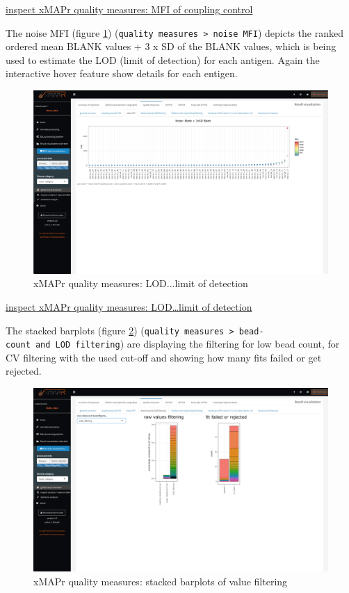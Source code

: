 \documentclass[
]{book}
\begin{document}
\href{figures/quality_measures__coupling_control_MFI.png}{inspect xMAPr quality measures: MFI of coupling control}

The noise MFI (figure \ref{fig:LOD}) (\texttt{quality\ measures\ \textgreater{}\ noise\ MFI}) depicts the ranked ordered mean BLANK values + 3 x SD of the BLANK values, which is being used to estimate the LOD (limit of detection) for each antigen. Again the interactive hover feature show details for each entigen.

\begin{figure}
\includegraphics[width=50.53in]{figures/quality_measures__LOD} \caption{xMAPr quality measures: LOD...limit of detection}\label{fig:LOD}
\end{figure}

\href{figures/quality_measures__LOD.png}{inspect xMAPr quality measures: LOD\ldots limit of detection}

The stacked barplots (figure \ref{fig:BarplotsValueFiltering}) (\texttt{quality\ measures\ \textgreater{}\ bead-count\ and\ LOD\ filtering}) are displaying the filtering for low bead count, for CV filtering with the used cut-off and showing how many fits failed or get rejected.

\begin{figure}
\includegraphics[width=50.47in]{figures/quality_measures__value_filtering} \caption{xMAPr quality measures: stacked barplots of value filtering}\label{fig:BarplotsValueFiltering}
\end{figure}
\end{document}
